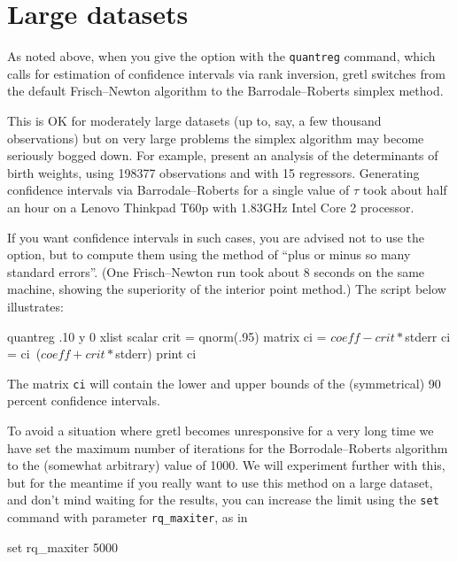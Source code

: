 \section{Large datasets}
\label{sec:bigdata}

As noted above, when you give the  option with the
\texttt{quantreg} command, which calls for estimation of confidence
intervals via rank inversion, gretl switches from the default
Frisch--Newton algorithm to the Barrodale--Roberts simplex method.

This is OK for moderately large datasets (up to, say, a few thousand
observations) but on very large problems the simplex algorithm may
become seriously bogged down.  For example, \cite{koenker-hallock01}
present an analysis of the determinants of birth weights, using 
198377 observations and with 15 regressors.  Generating confidence
intervals via Barrodale--Roberts for a single value of $\tau$ took
about half an hour on a Lenovo Thinkpad T60p with 1.83GHz Intel Core 2
processor.

If you want confidence intervals in such cases, you are advised not to
use the  option, but to compute them using the
method of ``plus or minus so many standard errors''.  (One
Frisch--Newton run took about 8 seconds on the same machine, showing
the superiority of the interior point method.)  The script below
illustrates:
%
\begin{code}
quantreg .10 y 0 xlist
scalar crit = qnorm(.95)
matrix ci = $coeff - crit * $stderr
ci = ci~($coeff + crit * $stderr)
print ci
\end{code}
%
The matrix \texttt{ci} will contain the lower and upper bounds of the
(symmetrical) 90 percent confidence intervals.

To avoid a situation where gretl becomes unresponsive for a very
long time we have set the maximum number of iterations for the
Borrodale--Roberts algorithm to the (somewhat arbitrary) value of
1000.  We will experiment further with this, but for the meantime if
you really want to use this method on a large dataset, and don't mind
waiting for the results, you can increase the limit using the
\texttt{set} command with parameter \verb|rq_maxiter|, as in
\begin{code}
set rq_maxiter 5000
\end{code}











